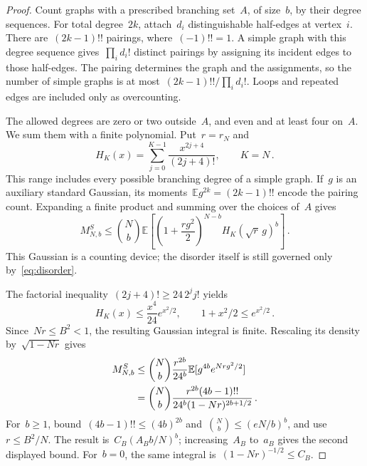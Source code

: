 \documentclass[10pt]{article}
\theoremstyle{plain}
\theoremstyle{definition}
\theoremstyle{remark}
\begin{document}
\begin{proof}
Count graphs with a prescribed branching set~$A$, of size~$b$, by their degree sequences. For total degree~$2k$, attach~$d_i$ distinguishable half-edges at vertex~$i$. There are~$(2k-1)!!$ pairings, where~$(-1)!!=1$. A simple graph with this degree sequence gives~$\prod_i d_i!$ distinct pairings by assigning its incident edges to those half-edges. The pairing determines the graph and the assignments, so the number of simple graphs is at most~$(2k-1)!!/\prod_i d_i!$. Loops and repeated edges are included only as overcounting.

The allowed degrees are zero or two outside~$A$, and even and at least four on~$A$. We sum them with a finite polynomial. Put~$r=r_N$ and
\begin{equation*}
 H_K(x)=\sum_{j=0}^{K-1}\frac{x^{2j+4}}{(2j+4)!},\qquad K=N\,.
\end{equation*}
This range includes every possible branching degree of a simple graph. If~$g$ is an auxiliary standard Gaussian, its moments~$\mathbb E g^{2k}=(2k-1)!!$ encode the pairing count. Expanding a finite product and summing over the choices of~$A$ gives
\begin{equation}\label{eq:tail-gaussian-pairing}
 M^S_{N,b}\le\binom Nb\mathbb E\left[\left(1+\frac{rg^2}{2}\right)^{N-b}H_K(\sqrt r\,g)^b\right]\,.
\end{equation}
This Gaussian is a counting device; the disorder itself is still governed only by~\eqref{eq:disorder}.

The factorial inequality~$(2j+4)!\ge24\,2^jj!$ yields
\begin{equation*}
 H_K(x)\le\frac{x^4}{24}e^{x^2/2},\qquad 1+x^2/2\le e^{x^2/2}\,.
\end{equation*}
Since~$Nr\le B^2<1$, the resulting Gaussian integral is finite. Rescaling its density by~$\sqrt{1-Nr}$ gives
\begin{align}
 M^S_{N,b}&\le\binom Nb\frac{r^{2b}}{24^b}\mathbb E[g^{4b}e^{Nrg^2/2}]\notag\\
 &=\binom Nb\frac{r^{2b}(4b-1)!!}{24^b(1-Nr)^{2b+1/2}}\,.\label{eq:tail-sk-pairing-bound}
\end{align}
For~$b\ge1$, bound~$(4b-1)!!\le(4b)^{2b}$ and~$\binom Nb\le(eN/b)^b$, and use~$r\le B^2/N$. The result is~$C_B(A_Bb/N)^b$; increasing~$A_B$ to~$a_B$ gives the second displayed bound. For~$b=0$, the same integral is~$(1-Nr)^{-1/2}\le C_B$.
\end{proof}
\end{document}
